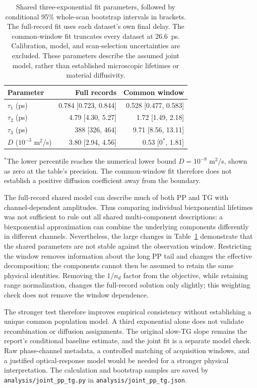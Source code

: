 \begin{table}[!htbp]
\centering
\caption{Shared three-exponential fit parameters, followed by conditional 95\% whole-scan bootstrap intervals in brackets. The full-record fit uses each dataset's own final delay. The common-window fit truncates every dataset at \SI{26.6}{ps}. Calibration, model, and scan-selection uncertainties are excluded. These parameters describe the assumed joint model, rather than established microscopic lifetimes or material diffusivity.}\label{tab:joint-parameters}
\begin{tabular}{lrr}
\toprule
Parameter & Full records & Common window\\
\midrule
$\tau_1$ (ps) & 0.784 [0.723, 0.844] & 0.528 [0.477, 0.583]\\
$\tau_2$ (ps) & 4.79 [4.30, 5.27] & 1.72 [1.49, 2.18]\\
$\tau_3$ (ps) & 388 [326, 464] & 9.71 [8.56, 13.11]\\
$D$ ($10^{-3}$ m$^2$/s) & 3.80 [2.94, 4.56] & 0.53 [$0^{*}$, 1.81]\\
\bottomrule
\end{tabular}

\smallskip
\parbox{.95\linewidth}{\small $^{*}$The lower percentile reaches the numerical lower bound $D=10^{-8}$ m$^2$/s, shown as zero at the table's precision. The common-window fit therefore does not establish a positive diffusion coefficient away from the boundary.}
\end{table}

The full-record shared model can describe much of both PP and TG with channel-dependent amplitudes. Thus comparing individual biexponential lifetimes was not sufficient to rule out all shared multi-component descriptions: a biexponential approximation can combine the underlying components differently in different channels. Nevertheless, the large changes in Table~\ref{tab:joint-parameters} demonstrate that the shared parameters are not stable against the observation window. Restricting the window removes information about the long PP tail and changes the effective decomposition; the components cannot then be assumed to retain the same physical identities. Removing the $1/n_d$ factor from the objective, while retaining range normalization, changes the full-record solution only slightly; this weighting check does not remove the window dependence.

The stronger test therefore improves empirical consistency without establishing a unique common population model. A third exponential alone does not validate recombination or diffusion assignments. The original slow-TG slope remains the report's conditional baseline estimate, and the joint fit is a separate model check. Raw phase-channel metadata, a controlled matching of acquisition windows, and a justified optical-response model would be needed for a stronger physical interpretation. The calculation and bootstrap samples are saved by \texttt{analysis/joint\_pp\_tg.py} in \texttt{analysis/joint\_pp\_tg.json}.
